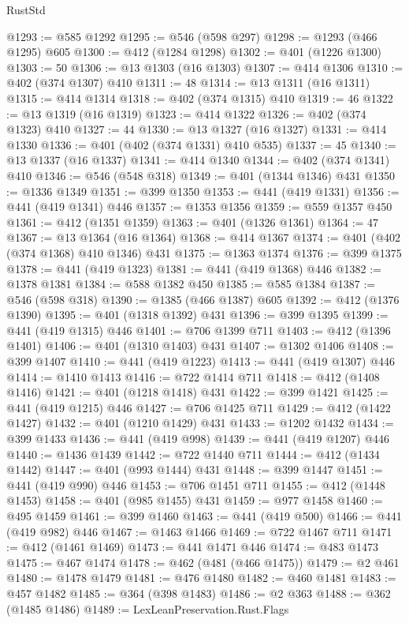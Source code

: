 \begin{lexlean}{RustStd}
\begin{coremodule}
@1293 := @585 @1292
@1295 := @546 (@598 @297)
@1298 := @1293 (@466 @1295) @605
@1300 := @412 (@1284 @1298)
@1302 := @401 (@1226 @1300)
@1303 := 50
@1306 := @13 @1303 (@16 @1303)
@1307 := @414 @1306
@1310 := @402 (@374 @1307) @410
@1311 := 48
@1314 := @13 @1311 (@16 @1311)
@1315 := @414 @1314
@1318 := @402 (@374 @1315) @410
@1319 := 46
@1322 := @13 @1319 (@16 @1319)
@1323 := @414 @1322
@1326 := @402 (@374 @1323) @410
@1327 := 44
@1330 := @13 @1327 (@16 @1327)
@1331 := @414 @1330
@1336 := @401 (@402 (@374 @1331) @410 @535)
@1337 := 45
@1340 := @13 @1337 (@16 @1337)
@1341 := @414 @1340
@1344 := @402 (@374 @1341) @410
@1346 := @546 (@548 @318)
@1349 := @401 (@1344 @1346) @431
@1350 := @1336 @1349
@1351 := @399 @1350
@1353 := @441 (@419 @1331)
@1356 := @441 (@419 @1341) @446
@1357 := @1353 @1356
@1359 := @559 @1357 @450
@1361 := @412 (@1351 @1359)
@1363 := @401 (@1326 @1361)
@1364 := 47
@1367 := @13 @1364 (@16 @1364)
@1368 := @414 @1367
@1374 := @401 (@402 (@374 @1368) @410 @1346) @431
@1375 := @1363 @1374
@1376 := @399 @1375
@1378 := @441 (@419 @1323)
@1381 := @441 (@419 @1368) @446
@1382 := @1378 @1381
@1384 := @588 @1382 @450
@1385 := @585 @1384
@1387 := @546 (@598 @318)
@1390 := @1385 (@466 @1387) @605
@1392 := @412 (@1376 @1390)
@1395 := @401 (@1318 @1392) @431
@1396 := @399 @1395
@1399 := @441 (@419 @1315) @446
@1401 := @706 @1399 @711
@1403 := @412 (@1396 @1401)
@1406 := @401 (@1310 @1403) @431
@1407 := @1302 @1406
@1408 := @399 @1407
@1410 := @441 (@419 @1223)
@1413 := @441 (@419 @1307) @446
@1414 := @1410 @1413
@1416 := @722 @1414 @711
@1418 := @412 (@1408 @1416)
@1421 := @401 (@1218 @1418) @431
@1422 := @399 @1421
@1425 := @441 (@419 @1215) @446
@1427 := @706 @1425 @711
@1429 := @412 (@1422 @1427)
@1432 := @401 (@1210 @1429) @431
@1433 := @1202 @1432
@1434 := @399 @1433
@1436 := @441 (@419 @998)
@1439 := @441 (@419 @1207) @446
@1440 := @1436 @1439
@1442 := @722 @1440 @711
@1444 := @412 (@1434 @1442)
@1447 := @401 (@993 @1444) @431
@1448 := @399 @1447
@1451 := @441 (@419 @990) @446
@1453 := @706 @1451 @711
@1455 := @412 (@1448 @1453)
@1458 := @401 (@985 @1455) @431
@1459 := @977 @1458
@1460 := @495 @1459
@1461 := @399 @1460
@1463 := @441 (@419 @500)
@1466 := @441 (@419 @982) @446
@1467 := @1463 @1466
@1469 := @722 @1467 @711
@1471 := @412 (@1461 @1469)
@1473 := @441 @1471 @446
@1474 := @483 @1473
@1475 := @467 @1474
@1478 := @462 (@481 (@466 @1475))
@1479 := @2 @461
@1480 := @1478 @1479
@1481 := @476 @1480
@1482 := @460 @1481
@1483 := @457 @1482
@1485 := @364 (@398 @1483)
@1486 := @2 @363
@1488 := @362 (@1485 @1486)
@1489 := LexLeanPreservation.Rust.Flags

\end{coremodule}
\end{lexlean}
